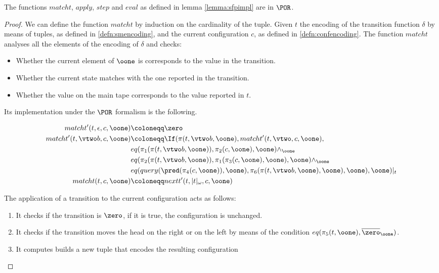 \begin{lemma}
\label{lemma:part2}
The functions $matcht$, $apply$, $step$ and $eval$ as defined in lemma \ref{lemma:sfpimpl} are in $\POR$.
\end{lemma}
\begin{proof}
We can define the function $matcht$ by induction on the cardinality of the tuple. Given $t$ the encoding of the transition function $\delta$ by means of tuples, as defined in \ref{defn:smencoding}, and the current configuration $c$, as defined in \ref{defn:confencoding}. The function $matcht$ analyses all the elements of the encoding of $\delta$ and checks:
\begin{itemize}
\item Whether the current element of $\oone$ is corresponds to the value in the transition.
\item Whether the current state matches with the one reported in the transition.
\item Whether the value on the main tape corresponds to the value reported in $t$.
\end{itemize}

Its implementation under the $\POR$ formalism is the following.

\begin{align*}
matcht'(t, \epsilon, c, \oone) &\coloneqq \zero\\
matcht'(t, \vtwo b, c, \oone) &\coloneqq \If (\pi(t, \vtwo b, \oone), matcht'(t, \vtwo, c, \oone), \\
                               & eq(\pi_1(\pi(t, \vtwo b, \oone)), \pi_2(c, \oone), \oone) \land_\oone\\
                               & eq(\pi_2(\pi(t, \vtwo b, \oone)), \pi_1(\pi_3(c, \oone),\oone), \oone) \land_\oone\\
                               & eq(query(\pred(\pi_4(c, \oone)), \oone), \pi_6(\pi(t, \vtwo b, \oone), \oone), \oone), \oone)|_{t}\\
matcht(t, c, \oone) &\coloneqq nextt'(t, |t|_\omega, c, \oone)
\end{align*}

The application of a transition to the current configuration acts as follows:

\begin{enumerate}
\item It checks if the transition is $\zero$, if it is true, the configuration is unchanged.
\item It checks if the transition moves the head on the right or on the left by means of the condition $eq(\pi_5(t, \oone), \overline \zero_\oone)$.
\item It computes builds a new tuple that encodes the resulting configuration
\end{enumerate}


\end{proof}
